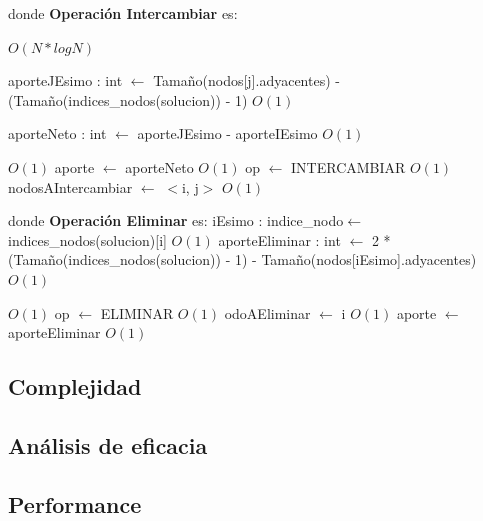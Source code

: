 \documentclass[a4paper, 10pt, twoside]{article}
\newenvironment{pseudo}[1][]{%
    \vspace{1em}%
    \begin{algorithmic}%
}
{%
    \end{algorithmic}%
    \vspace{1em}%
}
\newcommand{\Ode}[1]{\hfill $O(#1)$}
\begin{document}
\begin{pseudo}
\State
\State donde \textbf{Operación Intercambiar} es:
\State

											\Ode{N*log N}

					\State aporteJEsimo : int $\leftarrow$ Tamaño(nodos[j].adyacentes) -
					\State (Tamaño(indices\_nodos(solucion)) - 1)															\Ode{1}

					\State aporteNeto : int $\leftarrow$ aporteJEsimo - aporteIEsimo										\Ode{1}

																									\Ode{1}
						\State aporte $\leftarrow$ aporteNeto																\Ode{1}
						\State op $\leftarrow$ INTERCAMBIAR 																\Ode{1}
						\State nodosAIntercambiar $\leftarrow$ $<$i, j$>$ 													\Ode{1}
					\EndIf
				\EndIf
			\EndFor		

\State
\State donde \textbf{Operación Eliminar} es:
\State
			\State iEsimo : indice\_nodo$\leftarrow$ indices\_nodos(solucion)[i]											\Ode{1}
			\State aporteEliminar : int $\leftarrow$ 2 * (Tamaño(indices\_nodos(solucion)) - 1) - 
			\State Tamaño(nodos[iEsimo].adyacentes)																			\Ode{1}

																								\Ode{1}
				\State op $\leftarrow$ ELIMINAR 																			\Ode{1}
				\State odoAEliminar $\leftarrow$ i 																			\Ode{1}
				\State aporte $\leftarrow$ aporteEliminar 																	\Ode{1}
			\EndIf
		\EndFor


\end{pseudo}

\subsection{Complejidad}
\subsection{Análisis de eficacia}

\subsection{Performance}

\end{document}
